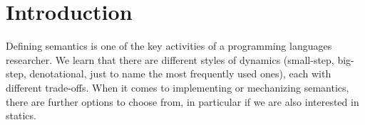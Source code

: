 \documentclass[acmsmall,anonymous,review,screen]{acmart}
\begin{document}




\maketitle

\section{Introduction}
\label{sec:introduction}

Defining semantics is one of the key activities of a programming
languages researcher. We learn that there are different styles of
dynamics (small-step, big-step, denotational, just to name the most
frequently used ones), each with different trade-offs. When it comes to
implementing or mechanizing semantics, there are further options to
choose from, in particular if we are also interested in statics.
\end{document}

